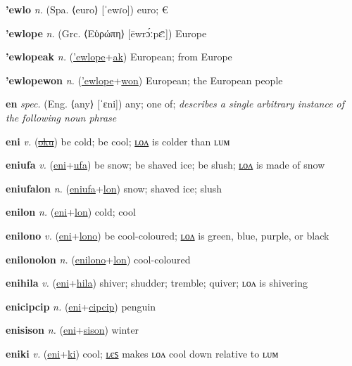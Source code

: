 \textbf{\hypertarget{'ewlo}{'ewlo}} \textit{n.} (Spa. ⟨euro⟩ [ˈewɾo])
euro; €

\textbf{\hypertarget{'ewlope}{'ewlope}} \textit{n.} (Grc. ⟨Εὐρώπη⟩ [ēwrɔ́ːpɛ̄ː])
Europe

\textbf{\hypertarget{'ewlopeak}{'ewlopeak}} \textit{n.} (\hyperlink{'ewlope}{'ewlope}+\allowbreak \hyperlink{ak}{ak})
European; from Europe

\textbf{\hypertarget{'ewlopewon}{'ewlopewon}} \textit{n.} (\hyperlink{'ewlope}{'ewlope}+\allowbreak \hyperlink{won}{won})
European; the European people

\textbf{\hypertarget{en}{en}} \textit{spec.} (Eng. ⟨any⟩ [ˈɛni])
any; one of; \textit{describes a single arbitrary instance of the following noun phrase}

\textbf{\hypertarget{eni}{eni}} \textit{v.} (\hyperlink{oku}{\sout{oku}})
be cold; be cool; \hyperlink{enilon}{ʟᴏᴧ} is colder than ʟᴜᴍ

\textbf{\hypertarget{eniufa}{eniufa}} \textit{v.} (\hyperlink{eni}{eni}+\allowbreak \hyperlink{ufa}{ufa})
be snow; be shaved ice; be slush; \hyperlink{eniufalon}{ʟᴏᴧ} is made of snow

\textbf{\hypertarget{eniufalon}{eniufalon}} \textit{n.} (\hyperlink{eniufa}{eniufa}+\allowbreak \hyperlink{lon}{lon})
snow; shaved ice; slush

\textbf{\hypertarget{enilon}{enilon}} \textit{n.} (\hyperlink{eni}{eni}+\allowbreak \hyperlink{lon}{lon})
cold; cool

\textbf{\hypertarget{enilono}{enilono}} \textit{v.} (\hyperlink{eni}{eni}+\allowbreak \hyperlink{lono}{lono})
be cool-coloured; \hyperlink{enilonolon}{ʟᴏᴧ} is green, blue, purple, or black

\textbf{\hypertarget{enilonolon}{enilonolon}} \textit{n.} (\hyperlink{enilono}{enilono}+\allowbreak \hyperlink{lon}{lon})
cool-coloured

\textbf{\hypertarget{enihila}{enihila}} \textit{v.} (\hyperlink{eni}{eni}+\allowbreak \hyperlink{hila}{hila})
shiver; shudder; tremble; quiver; ʟᴏᴧ is shivering

\textbf{\hypertarget{enicipcip}{enicipcip}} \textit{n.} (\hyperlink{eni}{eni}+\allowbreak \hyperlink{cipcip}{cipcip})
penguin

\textbf{\hypertarget{enisison}{enisison}} \textit{n.} (\hyperlink{eni}{eni}+\allowbreak \hyperlink{sison}{sison})
winter

\textbf{\hypertarget{eniki}{eniki}} \textit{v.} (\hyperlink{eni}{eni}+\allowbreak \hyperlink{ki}{ki})
cool; \hyperlink{enikiles}{ʟєꜱ} makes ʟᴏᴧ cool down relative to ʟᴜᴍ

